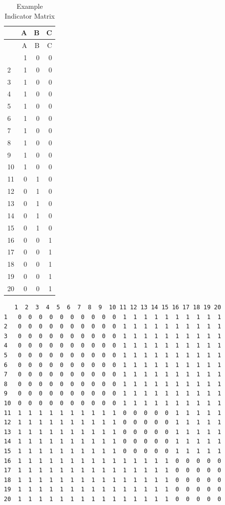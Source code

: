 \documentclass[
  12pt,
  letterpaper,
  DIV=11,
  numbers=noendperiod]{scrreprt}
\theoremstyle{remark}
\begin{document}
\begin{longtable}[]{@{}lrrr@{}}
\caption{Example Indicator Matrix}\tabularnewline
\toprule\noalign{}
& A & B & C \\
\midrule\noalign{}
\endfirsthead
\toprule\noalign{}
& A & B & C \\
\midrule\noalign{}
\endhead
\bottomrule\noalign{}
\endlastfoot
1 & 1 & 0 & 0 \\
2 & 1 & 0 & 0 \\
3 & 1 & 0 & 0 \\
4 & 1 & 0 & 0 \\
5 & 1 & 0 & 0 \\
6 & 1 & 0 & 0 \\
7 & 1 & 0 & 0 \\
8 & 1 & 0 & 0 \\
9 & 1 & 0 & 0 \\
10 & 1 & 0 & 0 \\
11 & 0 & 1 & 0 \\
12 & 0 & 1 & 0 \\
13 & 0 & 1 & 0 \\
14 & 0 & 1 & 0 \\
15 & 0 & 1 & 0 \\
16 & 0 & 0 & 1 \\
17 & 0 & 0 & 1 \\
18 & 0 & 0 & 1 \\
19 & 0 & 0 & 1 \\
20 & 0 & 0 & 1 \\
\end{longtable}

\begin{verbatim}
   1  2  3  4  5  6  7  8  9  10 11 12 13 14 15 16 17 18 19 20
1   0  0  0  0  0  0  0  0  0  0  1  1  1  1  1  1  1  1  1  1
2   0  0  0  0  0  0  0  0  0  0  1  1  1  1  1  1  1  1  1  1
3   0  0  0  0  0  0  0  0  0  0  1  1  1  1  1  1  1  1  1  1
4   0  0  0  0  0  0  0  0  0  0  1  1  1  1  1  1  1  1  1  1
5   0  0  0  0  0  0  0  0  0  0  1  1  1  1  1  1  1  1  1  1
6   0  0  0  0  0  0  0  0  0  0  1  1  1  1  1  1  1  1  1  1
7   0  0  0  0  0  0  0  0  0  0  1  1  1  1  1  1  1  1  1  1
8   0  0  0  0  0  0  0  0  0  0  1  1  1  1  1  1  1  1  1  1
9   0  0  0  0  0  0  0  0  0  0  1  1  1  1  1  1  1  1  1  1
10  0  0  0  0  0  0  0  0  0  0  1  1  1  1  1  1  1  1  1  1
11  1  1  1  1  1  1  1  1  1  1  0  0  0  0  0  1  1  1  1  1
12  1  1  1  1  1  1  1  1  1  1  0  0  0  0  0  1  1  1  1  1
13  1  1  1  1  1  1  1  1  1  1  0  0  0  0  0  1  1  1  1  1
14  1  1  1  1  1  1  1  1  1  1  0  0  0  0  0  1  1  1  1  1
15  1  1  1  1  1  1  1  1  1  1  0  0  0  0  0  1  1  1  1  1
16  1  1  1  1  1  1  1  1  1  1  1  1  1  1  1  0  0  0  0  0
17  1  1  1  1  1  1  1  1  1  1  1  1  1  1  1  0  0  0  0  0
18  1  1  1  1  1  1  1  1  1  1  1  1  1  1  1  0  0  0  0  0
19  1  1  1  1  1  1  1  1  1  1  1  1  1  1  1  0  0  0  0  0
20  1  1  1  1  1  1  1  1  1  1  1  1  1  1  1  0  0  0  0  0
\end{verbatim}
\end{document}
